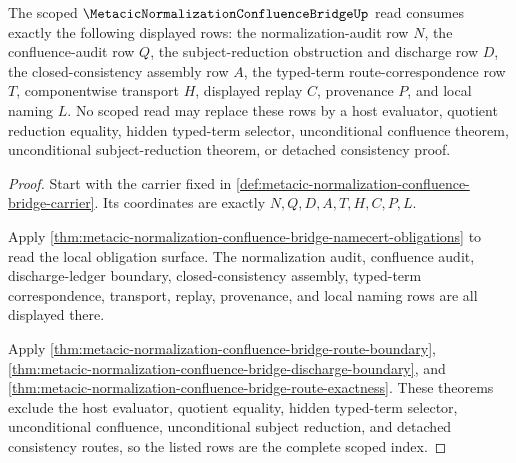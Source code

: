 \begin{theorem}
\label{thm:metacic-normalization-confluence-bridge-scope-index}
The scoped $\MetacicNormalizationConfluenceBridgeUp$ read consumes exactly the following displayed rows: the normalization-audit row $N$, the confluence-audit row $Q$, the subject-reduction obstruction and discharge row $D$, the closed-consistency assembly row $A$, the typed-term route-correspondence row $T$, componentwise transport $H$, displayed replay $C$, provenance $P$, and local naming $L$. No scoped read may replace these rows by a host evaluator, quotient reduction equality, hidden typed-term selector, unconditional confluence theorem, unconditional subject-reduction theorem, or detached consistency proof.
\end{theorem}
\begin{proof}
Start with the carrier fixed in \autoref{def:metacic-normalization-confluence-bridge-carrier}. Its coordinates are exactly $N,Q,D,A,T,H,C,P,L$.

Apply \autoref{thm:metacic-normalization-confluence-bridge-namecert-obligations} to read the local obligation surface. The normalization audit, confluence audit, discharge-ledger boundary, closed-consistency assembly, typed-term correspondence, transport, replay, provenance, and local naming rows are all displayed there.

Apply \autoref{thm:metacic-normalization-confluence-bridge-route-boundary}, \autoref{thm:metacic-normalization-confluence-bridge-discharge-boundary}, and \autoref{thm:metacic-normalization-confluence-bridge-route-exactness}. These theorems exclude the host evaluator, quotient equality, hidden typed-term selector, unconditional confluence, unconditional subject reduction, and detached consistency routes, so the listed rows are the complete scoped index.
\end{proof}

